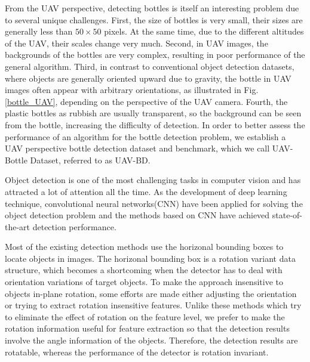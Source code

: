 
From the UAV perspective, detecting bottles is itself an interesting problem due to several unique challenges. First, the size of bottles is very small, their sizes are generally less than $ 50\times 50 $ pixels. At the same time, due to the different altitudes of the UAV, their scales change very much. Second, in UAV images, the backgrounds of the bottles are very complex, resulting in poor performance of the general algorithm. Third, in contrast to conventional object detection datasets, where objects are generally oriented upward due to gravity\cite{DOTA}, the bottle in UAV images often appear with arbitrary orientations, as illustrated in Fig.\ref{bottle_UAV}, depending on the perspective of the UAV camera. Fourth, the plastic bottles as rubbish are usually transparent, so the background can be seen from the bottle, increasing the difficulty of detection. In order to better assess the performance of an algorithm for the bottle detection problem, we establish a UAV perspective bottle detection dataset and benchmark, which we call UAV-Bottle Dataset, referred to as UAV-BD.

Object detection is one of the most challenging tasks in computer vision and has attracted a lot of attention all the time\cite{DRBox}. As the development of deep learning technique, convolutional neural networks(CNN) have been applied for solving the object detection problem and the methods based on CNN have achieved state-of-the-art detection performance\cite{DRBox}. 

Most of the existing detection methods use the horizonal bounding boxes to locate objects in images. The horizonal bounding box is a rotation variant data structure, which becomes a shortcoming when the detector has to deal with orientation variations of target objects. To make the approach insensitive to objects in-plane rotation, some efforts are made either adjusting the orientation or trying to extract rotation insensitive features. Unlike these methods which try to eliminate the effect of rotation on the feature level, we prefer to make the rotation information useful for feature extraction so that the detection results involve the angle information of the objects. Therefore, the detection results are rotatable, whereas the performance of the detector is rotation invariant\cite{DRBox}.